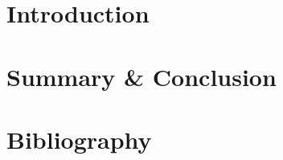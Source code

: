 \documentclass[fleqn,8pt,c]{beamer}
\begin{document}
\section{Introduction}





\section{Summary \& Conclusion}



\appendix
\section[x]{Bibliography}


\end{document}
